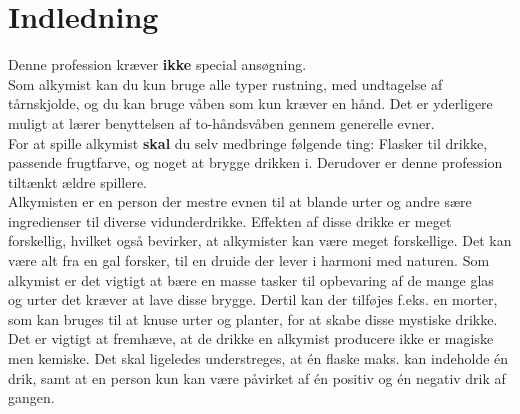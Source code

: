 
\chapter{Indledning}

Denne profession kræver \textbf{ikke} special ansøgning.\\
Som alkymist kan du kun bruge alle typer rustning, med undtagelse af tårnskjolde, og du kan bruge våben som kun kræver en hånd. Det er yderligere muligt at lærer benyttelsen af to-håndsvåben gennem generelle evner.\\

For at spille alkymist \textbf{skal} du selv medbringe følgende ting: Flasker til drikke, passende frugtfarve, og noget at brygge drikken i. Derudover er denne profession tiltænkt ældre spillere.\\

Alkymisten er en person der mestre evnen til at blande urter og andre sære ingredienser til diverse vidunderdrikke. Effekten af disse drikke er meget forskellig, hvilket også bevirker, at alkymister kan være meget forskellige. Det kan være alt fra en gal forsker, til en druide der lever i harmoni med naturen.
Som alkymist er det vigtigt at bære en masse tasker til opbevaring af de mange glas og urter det kræver at lave disse brygge. Dertil kan der tilføjes f.eks. en morter, som kan bruges til at knuse urter og planter, for at skabe disse mystiske drikke.\\
Det er vigtigt at fremhæve, at de drikke en alkymist producere ikke er magiske men kemiske. Det skal ligeledes understreges, at én flaske maks. kan indeholde én drik, samt at en person kun kan være påvirket af én positiv og én negativ drik af gangen.\\